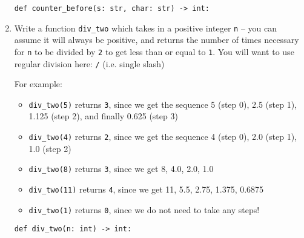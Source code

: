 \documentclass{article}
\begin{document}
\begin{enumerate}
    \vspace{0.2in}

    \verb|def counter_before(s: str, char: str) -> int:|
    \eject

  \item Write a function \verb|div_two| which takes in a positive integer \verb|n| -- you can assume it will always be positive, and returns the number of times necessary for \verb|n| to be divided by \verb|2| to get less than or equal to \verb|1|. You will want to use regular division here: \verb|/|  (i.e. single slash)

For example:
    \begin{itemize}
      \item \verb|div_two(5)| returns \verb|3|, since we get the sequence 5 (step 0), 2.5 (step 1), 1.125 (step 2), and finally 0.625 (step 3)
      \item \verb|div_two(4)| returns \verb|2|, since we get the sequence 4 (step 0), 2.0 (step 1), 1.0 (step 2)
      \item \verb|div_two(8)| returns \verb|3|, since we get 8, 4.0, 2.0, 1.0
      \item \verb|div_two(11)| returns \verb|4|, since we get 11, 5.5, 2.75, 1.375, 0.6875
      \item \verb|div_two(1)| returns \verb|0|, since we do not need to take any steps!
    \end{itemize}

    \vspace{0.2in}


    \verb|def div_two(n: int) -> int:|

\end{enumerate}
\end{document}
